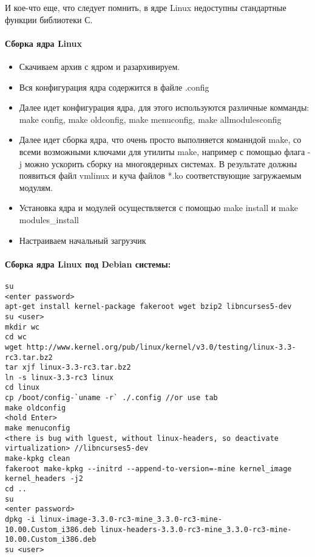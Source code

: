 И кое-что еще, что следует помнить, в ядре Linux недоступны стандартные функции библиотеки С.

\paragraph{Сборка ядра Linux}

\begin{itemize}
\item Скачиваем архив с ядром и разархивируем.

\item Вся конфигурация ядра содержится в файле .config

\item Далее идет конфигурация ядра, для этого используются различные комманды: make config, make oldconfig, make menuconfig,
make allmodulesconfig

\item Далее идет сборка ядра, что очень просто выполняется команндой make, со всеми возможными ключами для утилиты make, например с
помощью флага -j можно ускорить сборку на многоядерных системах. В результате должны появиться файл vmlinux и куча файлов *.ko
соответствующие загружаемым модулям.

\item Установка ядра и модулей осуществляется с помощью make install и make modules\_install

\item Настраиваем начальный загрузчик
\end{itemize}

\paragraph{Сборка ядра Linux под Debian системы:}

\begin{lstlisting}
su
<enter password>
apt-get install kernel-package fakeroot wget bzip2 libncurses5-dev
su <user>
mkdir wc
cd wc
wget http://www.kernel.org/pub/linux/kernel/v3.0/testing/linux-3.3-rc3.tar.bz2
tar xjf linux-3.3-rc3.tar.bz2
ln -s linux-3.3-rc3 linux
cd linux
cp /boot/config-`uname -r` ./.config //or use tab
make oldconfig
<hold Enter>
make menuconfig
<there is bug with lguest, without linux-headers, so deactivate virtualization> //libncurses5-dev
make-kpkg clean
fakeroot make-kpkg --initrd --append-to-version=-mine kernel_image kernel_headers -j2
cd ..
su
<enter password>
dpkg -i linux-image-3.3.0-rc3-mine_3.3.0-rc3-mine-10.00.Custom_i386.deb linux-headers-3.3.0-rc3-mine_3.3.0-rc3-mine-10.00.Custom_i386.deb
su <user>
\end{lstlisting}

